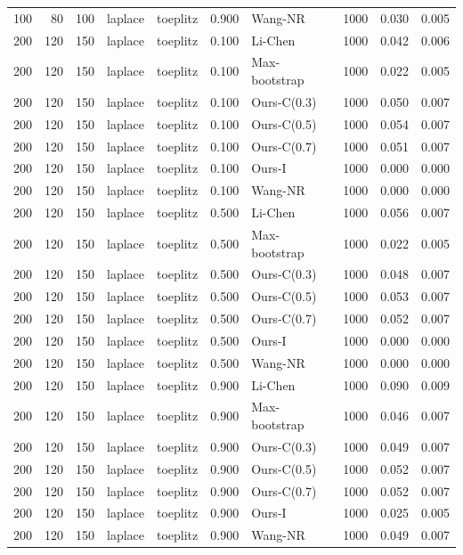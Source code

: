 \begin{tabular}{rrrllrlrrr}
100 & 80 & 100 & laplace & toeplitz & 0.900 & Wang-NR & 1000 & 0.030 & 0.005 \\
200 & 120 & 150 & laplace & toeplitz & 0.100 & Li-Chen & 1000 & 0.042 & 0.006 \\
200 & 120 & 150 & laplace & toeplitz & 0.100 & Max-bootstrap & 1000 & 0.022 & 0.005 \\
200 & 120 & 150 & laplace & toeplitz & 0.100 & Ours-C(0.3) & 1000 & 0.050 & 0.007 \\
200 & 120 & 150 & laplace & toeplitz & 0.100 & Ours-C(0.5) & 1000 & 0.054 & 0.007 \\
200 & 120 & 150 & laplace & toeplitz & 0.100 & Ours-C(0.7) & 1000 & 0.051 & 0.007 \\
200 & 120 & 150 & laplace & toeplitz & 0.100 & Ours-I & 1000 & 0.000 & 0.000 \\
200 & 120 & 150 & laplace & toeplitz & 0.100 & Wang-NR & 1000 & 0.000 & 0.000 \\
200 & 120 & 150 & laplace & toeplitz & 0.500 & Li-Chen & 1000 & 0.056 & 0.007 \\
200 & 120 & 150 & laplace & toeplitz & 0.500 & Max-bootstrap & 1000 & 0.022 & 0.005 \\
200 & 120 & 150 & laplace & toeplitz & 0.500 & Ours-C(0.3) & 1000 & 0.048 & 0.007 \\
200 & 120 & 150 & laplace & toeplitz & 0.500 & Ours-C(0.5) & 1000 & 0.053 & 0.007 \\
200 & 120 & 150 & laplace & toeplitz & 0.500 & Ours-C(0.7) & 1000 & 0.052 & 0.007 \\
200 & 120 & 150 & laplace & toeplitz & 0.500 & Ours-I & 1000 & 0.000 & 0.000 \\
200 & 120 & 150 & laplace & toeplitz & 0.500 & Wang-NR & 1000 & 0.000 & 0.000 \\
200 & 120 & 150 & laplace & toeplitz & 0.900 & Li-Chen & 1000 & 0.090 & 0.009 \\
200 & 120 & 150 & laplace & toeplitz & 0.900 & Max-bootstrap & 1000 & 0.046 & 0.007 \\
200 & 120 & 150 & laplace & toeplitz & 0.900 & Ours-C(0.3) & 1000 & 0.049 & 0.007 \\
200 & 120 & 150 & laplace & toeplitz & 0.900 & Ours-C(0.5) & 1000 & 0.052 & 0.007 \\
200 & 120 & 150 & laplace & toeplitz & 0.900 & Ours-C(0.7) & 1000 & 0.052 & 0.007 \\
200 & 120 & 150 & laplace & toeplitz & 0.900 & Ours-I & 1000 & 0.025 & 0.005 \\
200 & 120 & 150 & laplace & toeplitz & 0.900 & Wang-NR & 1000 & 0.049 & 0.007 \\

\end{tabular}
